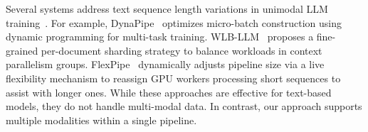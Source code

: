 Several systems address text sequence length variations in unimodal LLM training~\cite{wlb-llm-osdi25,dynapipe-eurosys24,flexpipe-atc25,byte-transformer-ipdps23,sppo-arxiv25}. For example, DynaPipe~\cite{dynapipe-eurosys24} optimizes micro-batch construction using dynamic programming for multi-task training. WLB-LLM~\cite{wlb-llm-osdi25} proposes a fine-grained per-document sharding strategy to balance workloads in context parallelism groups. FlexPipe~\cite{flexpipe-atc25} dynamically adjusts pipeline size via a live flexibility mechanism to reassign GPU workers processing short sequences to assist with longer ones. While these approaches are effective for text-based models, they do not handle multi-modal data. In contrast, our approach supports multiple modalities within a single pipeline.




